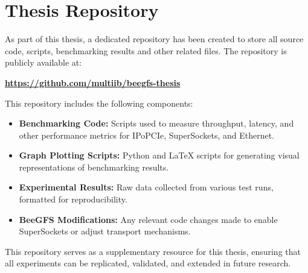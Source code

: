 \chapter{Thesis Repository}
As part of this thesis, a dedicated repository has been created to store all source code, scripts, benchmarking results and other related files. The repository is publicly available at:

\begin{center}
\textbf{\url{https://github.com/multiib/beegfs-thesis}}
\end{center}

This repository includes the following components:

\begin{itemize}
    \item \textbf{Benchmarking Code:} Scripts used to measure throughput, latency, and other performance metrics for IPoPCIe, SuperSockets, and Ethernet.
    \item \textbf{Graph Plotting Scripts:} Python and LaTeX scripts for generating visual representations of benchmarking results.
    \item \textbf{Experimental Results:} Raw data collected from various test runs, formatted for reproducibility.
    \item \textbf{BeeGFS Modifications:} Any relevant code changes made to enable SuperSockets or adjust transport mechanisms.
\end{itemize}

This repository serves as a supplementary resource for this thesis, ensuring that all experiments can be replicated, validated, and extended in future research.

